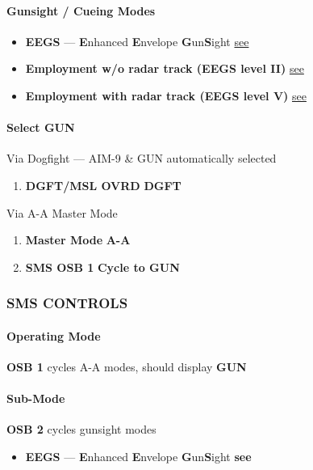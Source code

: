 \paragraph{Gunsight / Cueing Modes}
\begin{itemize}
    \item \textbf{EEGS} --- \textbf{E}nhanced \textbf{E}nvelope \textbf{G}un\textbf{S}ight
    \hfill\hyperref[subsec:m61:eegssymb]{see }
    \item \textbf{Employment w/o radar track (EEGS level II)}
    \hfill\hyperref[subsec:m61:eegslvl2]{see }
    \item \textbf{Employment with radar track (EEGS level V)}
    \hfill\hyperref[subsec:m61:eegslvl5]{see }
\end{itemize}
\paragraph{Select GUN}
Via Dogfight --- AIM-9 \& GUN automatically selected

\begin{enumerate}
    \item \textbf{DGFT/MSL OVRD} \dotfill \textbf{DGFT}
\end{enumerate}

Via A-A Master Mode

\begin{enumerate}
    \item \textbf{Master Mode} \dotfill \textbf{A-A}
    \item \textbf{SMS OSB 1} \dotfill \textbf{Cycle to GUN}
\end{enumerate}

\subsubsection{SMS CONTROLS}
\label{subsec:m61:sms}

\paragraph{Operating Mode} 
\textbf{OSB 1} cycles A-A modes, should display \textbf{GUN}
\paragraph{Sub-Mode}
\textbf{OSB 2} cycles gunsight modes

\begin{itemize}
    \item \textbf{EEGS} --- \textbf{E}nhanced \textbf{E}nvelope \textbf{G}un\textbf{S}ight
    \hfill\textbf{see }
\end{itemize}
